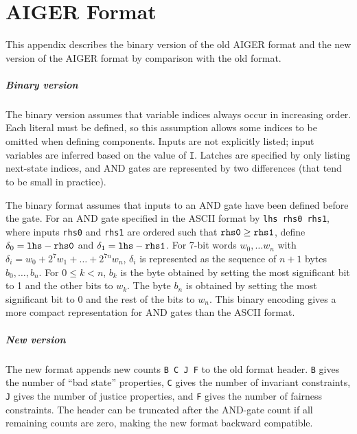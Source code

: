 \documentclass[12pt,a4paper,twoside,openright]{report}
\begin{document}
{{\chapter{AIGER Format}
\label{aiger}
This appendix describes the binary version of the old AIGER format
and the new version of the AIGER format by
comparison with the old format.

\paragraph{Binary version}{
The binary version assumes that variable indices always
occur in increasing order. Each literal must be defined, so this assumption
allows some indices to be omitted when defining components.
Inputs are not explicitly listed; input variables are inferred based on
the value of \verb,I,.
Latches are specified by only listing next-state
indices, and AND gates are represented by two differences (that tend to be
small in practice).

The binary format assumes that inputs to an AND gate
have been defined before the gate.
For an AND gate specified in the ASCII format by \verb,lhs rhs0 rhs1,,
where inputs \verb,rhs0, and \verb,rhs1, are ordered such that
$\verb,rhs0, \geq \verb,rhs1,$, define
$\delta_0 = \verb,lhs, - \verb,rhs0,$
and
$\delta_1 = \verb,lhs, - \verb,rhs1,$.
For 7-bit words $w_0, \ldots w_n$ with
$\delta_i = w_0 + 2^7w_1 + \ldots + 2^{7n}w_n$,
$\delta_i$ is represented as the sequence of $n + 1$ bytes
$b_0, \ldots, b_n$.
For $0 \leq k < n$, $b_k$ is the byte obtained by setting the most
significant bit to 1 and the other bits to $w_k$. The byte
$b_n$ is obtained by setting the most
significant bit to 0 and the rest of the bits to $w_n$.
This binary encoding gives a more compact representation for AND
gates than the ASCII format.
}

\paragraph{New version} {
The new format appends new counts \verb,B C J F, to the old
format header.
\verb,B, gives the number of ``bad state'' properties,
\verb,C, gives the number of invariant constraints,
\verb,J, gives the number of justice properties, and
\verb,F, gives the number of fairness constraints.
The header can be truncated
after the AND-gate count if all remaining counts are
zero, making the new format
backward compatible.

}}}
\end{document}
